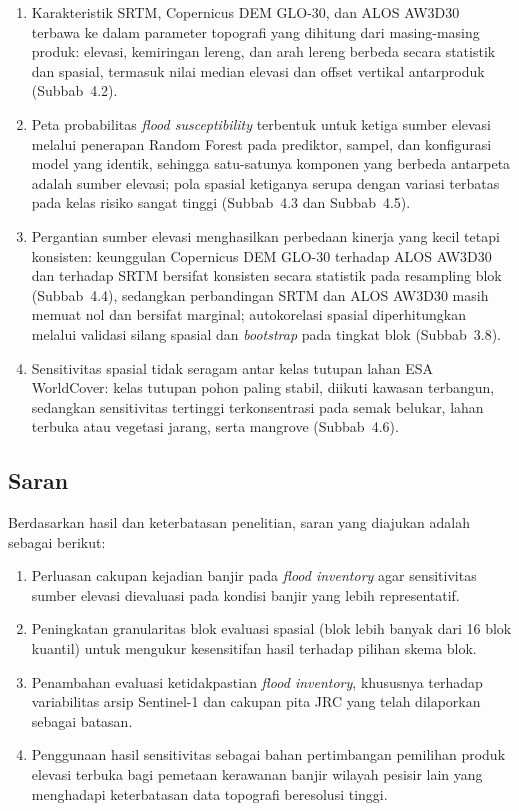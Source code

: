 \documentclass[12pt]{article}
\begin{document}
\begin{enumerate}
\item Karakteristik SRTM, Copernicus DEM GLO-30, dan ALOS AW3D30 terbawa
ke dalam parameter topografi yang dihitung dari masing-masing produk: elevasi,
kemiringan lereng, dan arah lereng berbeda secara statistik dan spasial,
termasuk nilai median elevasi dan offset vertikal antarproduk (Subbab~4.2).
\item Peta probabilitas \textit{flood susceptibility} terbentuk untuk
ketiga sumber elevasi melalui penerapan Random Forest pada prediktor, sampel,
dan konfigurasi model yang identik, sehingga satu-satunya komponen yang
berbeda antarpeta adalah sumber elevasi; pola spasial ketiganya serupa dengan
variasi terbatas pada kelas risiko sangat tinggi (Subbab~4.3 dan Subbab~4.5).
\item Pergantian sumber elevasi menghasilkan perbedaan kinerja yang kecil
tetapi konsisten: keunggulan Copernicus DEM GLO-30 terhadap ALOS AW3D30 dan
terhadap SRTM bersifat konsisten secara statistik pada resampling blok
(Subbab~4.4), sedangkan perbandingan SRTM dan ALOS AW3D30 masih memuat nol
dan bersifat marginal; autokorelasi spasial diperhitungkan melalui validasi
silang spasial dan \textit{bootstrap} pada tingkat blok (Subbab~3.8).
\item Sensitivitas spasial tidak seragam antar kelas tutupan lahan ESA
WorldCover: kelas tutupan pohon paling stabil, diikuti kawasan terbangun,
sedangkan sensitivitas tertinggi terkonsentrasi pada semak belukar, lahan
terbuka atau vegetasi jarang, serta mangrove (Subbab~4.6).
\end{enumerate}

\subsection{Saran}

Berdasarkan hasil dan keterbatasan penelitian, saran yang diajukan adalah
sebagai berikut:

\begin{enumerate}
\item Perluasan cakupan kejadian banjir pada \textit{flood inventory} agar
sensitivitas sumber elevasi dievaluasi pada kondisi banjir yang lebih
representatif.
\item Peningkatan granularitas blok evaluasi spasial (blok lebih banyak dari
16 blok kuantil) untuk mengukur kesensitifan hasil terhadap pilihan skema
blok.
\item Penambahan evaluasi ketidakpastian \textit{flood inventory}, khususnya
terhadap variabilitas arsip Sentinel-1 dan cakupan pita JRC yang telah
dilaporkan sebagai batasan.
\item Penggunaan hasil sensitivitas sebagai bahan pertimbangan pemilihan
produk elevasi terbuka bagi pemetaan kerawanan banjir wilayah pesisir lain
yang menghadapi keterbatasan data topografi beresolusi tinggi.
\end{enumerate}

\FloatBarrier

\clearpage
\printbibliography[title={Daftar Pustaka}]
\end{document}
